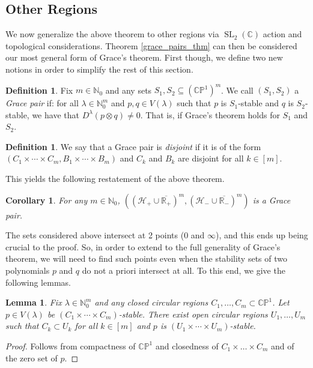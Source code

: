 \documentclass{article}
\newtheorem{lemma}[theorem]{Lemma}
\newtheorem{corollary}[theorem]{Corollary}
\theoremstyle{definition}
\newtheorem{definition}[theorem]{Definition}
\theoremstyle{plain}
\newcommand{\C}{\mathbb{C}}
\newcommand{\R}{\mathbb{R}}
\newcommand{\N}{\mathbb{N}}
\newcommand{\CP}{\mathbb{CP}}
\newcommand{\UHP}{\mathcal{H}_+}
\newcommand{\LHP}{\mathcal{H}_-}
\DeclareMathOperator{\SL}{SL}
\begin{document}
\subsection{Other Regions}

We now generalize the above theorem to other regions via $\SL_2(\C)$ action and topological considerations. Theorem \ref{grace_pairs_thm} can then be considered our most general form of Grace's theorem. First though, we define two new notions in order to simplify the rest of this section.

\begin{definition} \label{grace_pair_def}
    Fix $m \in \N_0$ and any sets $S_1,S_2 \subseteq (\CP^1)^m$. We call $(S_1,S_2)$ a \emph{Grace pair} if: for all $\lambda \in \N_0^m$ and $p,q \in V(\lambda)$ such that $p$ is $S_1$-stable and $q$ is $S_2$-stable, we have that $D^\lambda(p \otimes q) \neq 0$. That is, if Grace's theorem holds for $S_1$ and $S_2$.
\end{definition}

\begin{definition}
    We say that a Grace pair is \emph{disjoint} if it is of the form $(C_1 \times \cdots \times C_m, B_1 \times \cdots \times B_m)$ and $C_k$ and $B_k$ are disjoint for all $k \in [m]$.
\end{definition}

This yields the following restatement of the above theorem.

\begin{corollary}
    For any $m \in \N_0$, $((\UHP \cup \overline{\R_+})^m, (\LHP \cup \overline{\R_-})^m)$ is a Grace pair.
\end{corollary}

The sets considered above intersect at 2 points ($0$ and $\infty$), and this ends up being crucial to the proof. So, in order to extend to the full generality of Grace's theorem, we will need to find such points even when the stability sets of two polynomials $p$ and $q$ do not a priori intersect at all. To this end, we give the following lemmas.

\begin{lemma} \label{stability_closed_to_open}
    Fix $\lambda \in \N_0^m$ and any closed circular regions $C_1,\ldots,C_m \subset \CP^1$. Let $p \in V(\lambda)$ be $(C_1 \times \cdots \times C_m)$-stable. There exist open circular regions $U_1,\ldots,U_m$ such that $C_k \subset U_k$ for all $k \in [m]$ and $p$ is $(U_1 \times \cdots \times U_m)$-stable.
\end{lemma}
\begin{proof}
    Follows from compactness of $\CP^1$ and closedness of $C_1 \times \ldots \times C_m$ and of the zero set of $p$.
\end{proof}
\end{document}
